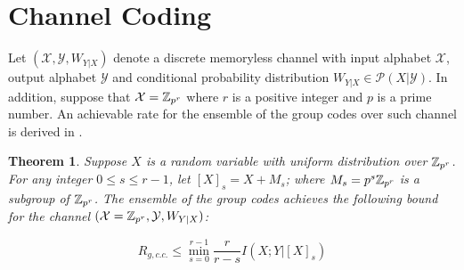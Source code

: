 \documentclass[conference]{IEEEtran}
\theoremstyle{plain}
\newtheorem{thm}{Theorem}
\theoremstyle{definition}
\theoremstyle{remark}
\begin{document}
\section{Channel Coding}

Let $(\mathcal{X},\mathcal{Y}, W_{Y|X})$ denote a discrete memoryless channel with input alphabet $\mathcal{X}$, output alphabet $\mathcal{Y}$ and conditional probability distribution $W_{Y|X} \in \mathcal{P}(X|\mathcal{Y})$. In addition, suppose that $\mathcal{X}=\mathbb{Z}_{p^r}$ where $r$ is a positive integer and $p$ is a prime number. An achievable rate for the ensemble of the group codes over such channel is derived in \cite{Aria-group 2}.


\begin{thm}\label{thm: group codes channel}
 Suppose $X$ is a random variable with uniform distribution over $\mathbb{Z}_{p^r}$. For any integer $0\leq s \leq r-1$, let $[X]_{s}=X+M_s$; where $M_s = p^s\mathbb{Z}_{p^r}$ is a subgroup of $\mathbb{Z}_{p^r}$. The ensemble of the group codes achieves the following bound for the channel $(\mathcal{X}=\mathbb{Z}_{p^r},\mathcal{Y}, W_{Y|X})$:

\begin{equation*}
R_{g,c.c.}\leq \min_{s=0}^{r-1} \frac{r}{r-s} I(X;Y|[X]_{s})
\end{equation*}
\end{thm}
\end{document}

